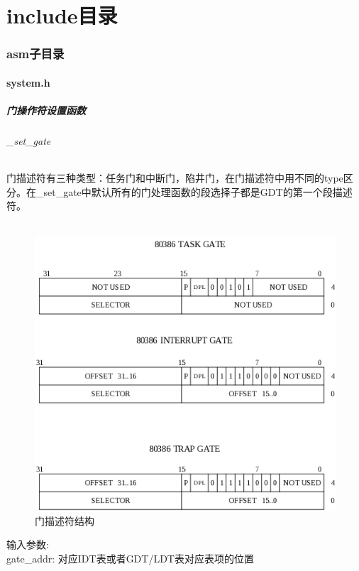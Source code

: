 \documentclass[12pt]{article}
\begin{document}
\part{include目录}
\section{asm子目录}
\subsection{system.h}	
\subsubsection{门操作符设置函数}	
\paragraph{\_set\_gate}	
门描述符有三种类型：任务门和中断门，陷井门，在门描述符中用不同的type区分。在\_set\_gate中默认所有的门处理函数的段选择子都是GDT的第一个段描述符。\\\\
\begin{figure}[htbp]
\centering
\includegraphics[scale=0.7]{fig/12.png}
\caption{门描述符结构}
\label{fig:Gate Discriptor}
\end{figure}
输入参数:\\
gate\_addr: 对应IDT表或者GDT/LDT表对应表项的位置\\
\end{document}
